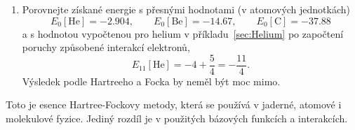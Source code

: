 \begin{enumerate}
    \item Porovnejte získané energie s přesnými hodnotami (v atomových jednotkách)
        \begin{equation*}
            E_{0}[\text{He}]=-2.904,\qquad
            E_{0}[\text{Be}]=-14.67,\qquad
            E_{0}[\text{C}]=-37.88
        \end{equation*}
        a s hodnotou vypočtenou pro helium v příkladu~\ref{sec:Helium} po započtení poruchy způsobené interakcí elektronů,
        \begin{equation*}
            E_{11}[\text{He}]=-4+\frac{5}{4}=-\frac{11}{4}.
        \end{equation*}
        Výsledek podle Hartreeho a Focka by neměl být moc mimo.
    \end{enumerate}

    Toto je esence Hartree-Fockovy metody, která se používá v jaderné, atomové i molekulové fyzice.
    Jediný rozdíl je v použitých bázových funkcích a interakcích.

